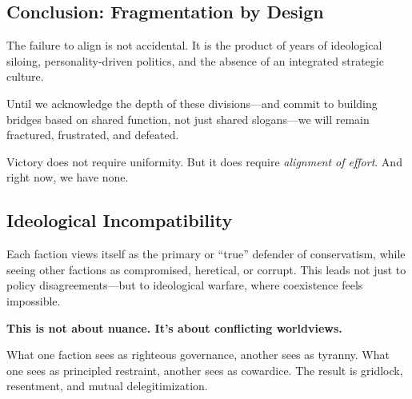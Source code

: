 \subsection{Conclusion: Fragmentation by Design}
The failure to align is not accidental. It is the product of years of ideological siloing, personality-driven politics, and the absence of an integrated strategic culture.

Until we acknowledge the depth of these divisions—and commit to building bridges based on shared function, not just shared slogans—we will remain fractured, frustrated, and defeated.

Victory does not require uniformity. But it does require \textit{alignment of effort}. And right now, we have none.

\subsection{Ideological Incompatibility}

Each faction views itself as the primary or “true” defender of conservatism, while seeing other factions as compromised, heretical, or corrupt. This leads not just to policy disagreements—but to ideological warfare, where coexistence feels impossible.

\textbf{This is not about nuance. It’s about conflicting worldviews.}\newline

What one faction sees as righteous governance, another sees as tyranny. What one sees as principled restraint, another sees as cowardice. The result is gridlock, resentment, and mutual delegitimization.

